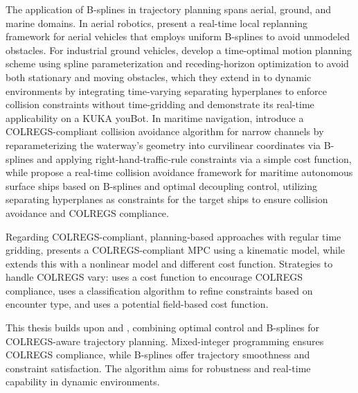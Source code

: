 The application of B-splines in trajectory planning spans aerial, ground, and marine domains. In aerial robotics, \citet{usenko2017real} present a real-time local replanning framework for aerial vehicles that employs uniform B-splines to avoid unmodeled obstacles. For industrial ground vehicles, \citet{mercy2016spline} develop a time-optimal motion planning scheme using spline parameterization and receding-horizon optimization to avoid both stationary and moving obstacles, which they extend in \citet{mercy2017spline} to dynamic environments by integrating time-varying separating hyperplanes to enforce collision constraints without time-gridding and demonstrate its real-time applicability on a KUKA youBot. In maritime navigation, \citet{cho2021colreg} introduce a COLREGS-compliant collision avoidance algorithm for narrow channels by reparameterizing the waterway’s geometry into curvilinear coordinates via B-splines and applying right-hand-traffic-rule constraints via a simple cost function, while \citet{zhang2021real} propose a real-time collision avoidance framework for maritime autonomous surface ships based on B-splines and optimal decoupling control, utilizing separating hyperplanes as constraints for the target ships to ensure collision avoidance and COLREGS compliance. 


Regarding \acrshort{COLREGS}-compliant, planning‐based approaches with regular time gridding,
\citet{Hagen2018} presents a COLREGS-compliant MPC using a kinematic model, while \citet{Menges2024} extends this with a nonlinear model and different cost function. Strategies to handle \acrshort{COLREGS} vary: \citet{Hagen2018} uses a cost function to encourage COLREGS compliance, \citet{Thyri2022-MPC} uses a classification algorithm to refine constraints based on encounter type, and \citet{Menges2024} uses a potential field-based cost function.

This thesis builds upon \citet{Thyri2022-MPC} and \citet{zhang2021real}, combining optimal control and B-splines for COLREGS-aware trajectory planning. Mixed-integer programming ensures COLREGS compliance, while B-splines offer trajectory smoothness and constraint satisfaction. The algorithm aims for robustness and real-time capability in dynamic environments.




